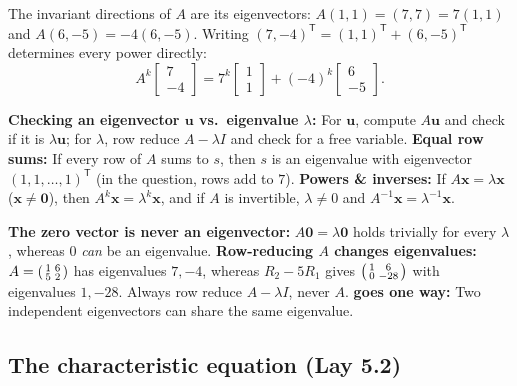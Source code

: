 \documentclass[10pt]{scrartcl}
\newcommand{\vv}[1]{\mathbf{#1}}
\begin{document}
\revisit The invariant directions of $A$ are its eigenvectors: $A(1,1)=(7,7)=7(1,1)$ and $A(6,-5)=-4(6,-5)$. Writing $(7,-4)^{\mathsf T}=(1,1)^{\mathsf T}+(6,-5)^{\mathsf T}$ determines every power directly:
\[
  A^k\begin{bmatrix}7\\-4\end{bmatrix} = 7^k\begin{bmatrix}1\\1\end{bmatrix} + (-4)^k\begin{bmatrix}6\\-5\end{bmatrix}.
\]

\begin{shortcuts}
  \ii \textbf{Checking an eigenvector $\vv u$ vs.\ eigenvalue $\lambda$:} For $\vv u$, compute $A\vv u$ and check if it is $\lambda\vv u$; for $\lambda$, row reduce $A-\lambda I$ and check for a free variable.
  \ii \textbf{Equal row sums:} If every row of $A$ sums to $s$, then $s$ is an eigenvalue with eigenvector $(1,1,\dots,1)^{\mathsf T}$ (in the question, rows add to $7$).
  \ii \textbf{Powers \& inverses:} If $A\vv x=\lambda\vv x$ ($\vv x\neq\vv 0$), then $A^k\vv x=\lambda^k\vv x$, and if $A$ is invertible, $\lambda\ne 0$ and $A^{-1}\vv x=\lambda^{-1}\vv x$.
\end{shortcuts}

\begin{trapbox}
  \ii \textbf{The zero vector is never an eigenvector:} $A\vv 0=\lambda\vv 0$ holds trivially for every $\lambda$, whereas $0$ \emph{can} be an eigenvalue.
  \ii \textbf{Row-reducing $A$ changes eigenvalues:} $A=\begin{psmallmatrix}1&6\\5&2\end{psmallmatrix}$ has eigenvalues $7,-4$, whereas $R_2-5R_1$ gives $\begin{psmallmatrix}1&6\\0&-28\end{psmallmatrix}$ with eigenvalues $1,-28$. Always row reduce $A-\lambda I$, never $A$.
  \ii \textbf{ goes one way:} Two independent eigenvectors can share the same eigenvalue.
\end{trapbox}

\subsection{The characteristic equation (Lay 5.2)}
\end{document}
